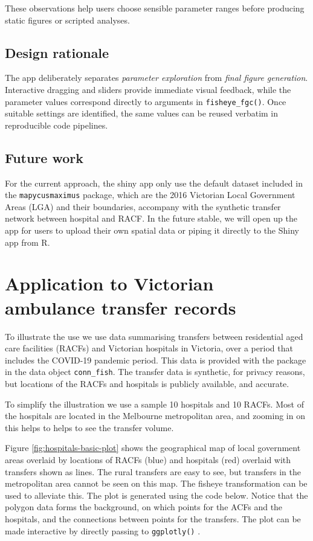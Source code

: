 These observations help users choose sensible parameter ranges before producing static figures or scripted analyses.

\subsection{Design rationale}\label{design-rationale}

The app deliberately separates \emph{parameter exploration} from \emph{final figure generation}. Interactive dragging and sliders provide immediate visual feedback, while the parameter values correspond directly to arguments in \texttt{fisheye\_fgc()}. Once suitable settings are identified, the same values can be reused verbatim in reproducible code pipelines.

\subsection{Future work}\label{future-work}

For the current approach, the shiny app only use the default dataset included in the \texttt{mapycusmaximus} package, which are the 2016 Victorian Local Government Areas (LGA) and their boundaries, accompany with the synthetic transfer network between hospital and RACF. In the future stable, we will open up the app for users to upload their own spatial data or piping it directly to the Shiny app from R.

\section{Application to Victorian ambulance transfer records}\label{application}

To illustrate the use we use data summarising transfers between residential aged care facilities (RACFs) and Victorian hospitals in Victoria, over a period that includes the COVID-19 pandemic period. This data is provided with the package in the data object \texttt{conn\_fish}. The transfer data is synthetic, for privacy reasons, but locations of the RACFs and hospitals is publicly available, and accurate.

To simplify the illustration we use a sample 10 hospitals and 10 RACFs. Most of the hospitals are located in the Melbourne metropolitan area, and zooming in on this helps to helps to see the transfer volume.

Figure \ref{fig:hospitals-basic-plot} shows the geographical map of local government areas overlaid by locations of RACFs (blue) and hospitals (red) overlaid with transfers shown as lines. The rural transfers are easy to see, but transfers in the metropolitan area cannot be seen on this map. The fisheye transformation can be used to alleviate this. The plot is generated using the code below. Notice that the polygon data forms the background, on which points for the ACFs and the hospitals, and the connections between points for the transfers. The plot can be made interactive by directly passing to \texttt{ggplotly()} \citep{ggplotly}.

